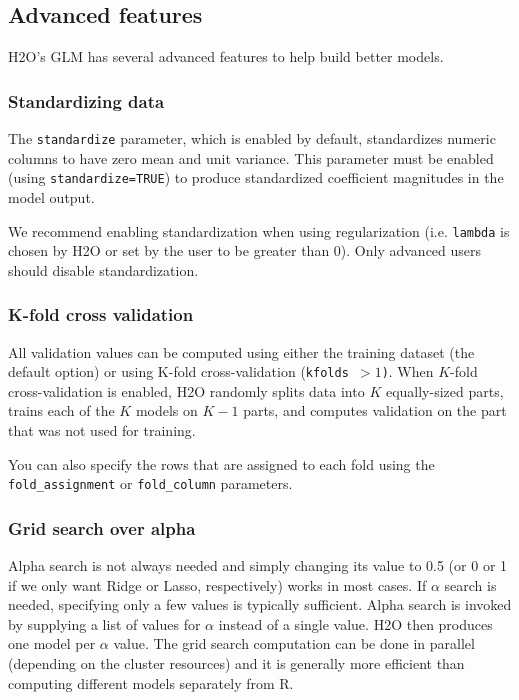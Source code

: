\bigskip
\waterExampleInR


\waterExampleInPython


\subsection{Advanced features}

H2O's GLM has several advanced features to help build better models.

\subsubsection{Standardizing data}

The \texttt{standardize} parameter, which is enabled by default, standardizes numeric columns to have zero mean and
unit variance.  This parameter must be enabled (using \texttt{standardize=TRUE}) to produce standardized coefficient magnitudes in the model output.

We recommend enabling standardization when using regularization (i.e. \texttt{lambda} is chosen by H2O or set by
the user to be greater than 0). Only advanced users should disable standardization.

\subsubsection{K-fold cross validation}

All validation values can be computed using either the training dataset (the default option) or using K-fold
cross-validation (\texttt{kfolds $> 1$)}. When $K$-fold cross-validation is enabled, H2O randomly splits data into $K$
equally-sized parts, trains each of the $K$ models on $K-1$ parts, and computes validation on the part that was not
used for training.

You can also specify the rows that are assigned to each fold using the \texttt{fold\_assignment}
or \texttt{fold\_column} parameters.

\bigskip
\waterExampleInR




\subsubsection{Grid search over alpha}

Alpha search is not always needed and simply changing its value to 0.5 (or 0 or 1 if we only want Ridge or Lasso,
respectively) works in most cases. If $\alpha$ search is needed, specifying only a few values is typically sufficient. Alpha
search is invoked by supplying a list of values for $\alpha$ instead of a single value. H2O then produces one model
per $\alpha$ value. The grid search computation can be done in parallel (depending on the cluster resources) and it
is generally more efficient than computing different models separately from R.

